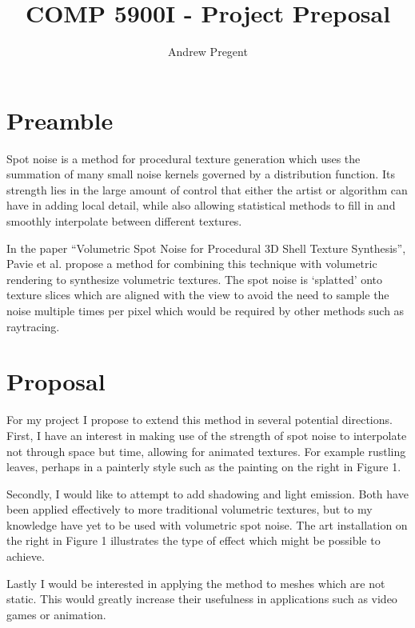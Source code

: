 \documentclass{article}
\title{\vspace{-2.5cm}COMP 5900I - Project Preposal}
\author{Andrew Pregent}
\date{}
\begin{document}
\maketitle{}
\section{Preamble}
Spot noise is a method for procedural texture generation which uses the summation of many small noise kernels governed by a distribution function\cite{10.1145/122718.122751}. Its strength lies in the large amount of control that either the artist or algorithm can have in adding local detail, while also allowing statistical methods to fill in and smoothly interpolate between different textures.

In the paper ``Volumetric Spot Noise for Procedural 3D Shell Texture Synthesis''\cite{pavie:hal-02413269}, Pavie et al. propose a method for combining this technique with volumetric rendering to synthesize volumetric textures. The spot noise is `splatted' onto texture slices which are aligned with the view to avoid the need to sample the noise multiple times per pixel which would be required by other methods such as raytracing.

\section{Proposal}

For my project I propose to extend this method in several potential directions. First, I have an interest in making use of the strength of spot noise to interpolate not through space but time, allowing for animated textures. For example rustling leaves, perhaps in a painterly style such as the painting on the right in Figure 1.

Secondly, I would like to attempt to add shadowing and light emission. Both have been applied effectively to more traditional volumetric textures\cite{FernGPU2004}\cite{Villemin2013Flames}, but to my knowledge have yet to be used with volumetric spot noise. The art installation on the right in Figure 1 illustrates the type of effect which might be possible to achieve.

Lastly I would be interested in applying the method to meshes which are not static. This would greatly increase their usefulness in applications such as video games or animation.
\end{document}
